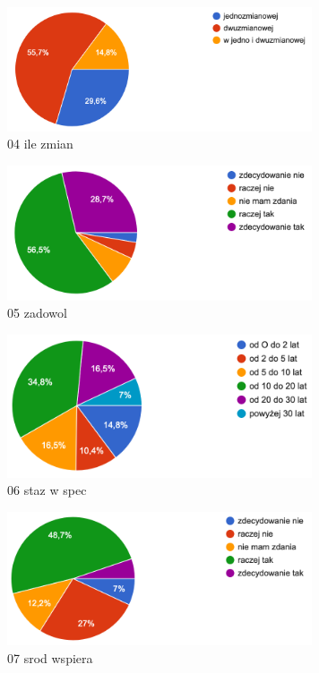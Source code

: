 \begin{figure}
    \includegraphics[width=9cm]{wyniki/04_ile_zmian}
    \caption{ 04 ile zmian }
\end{figure}

\begin{figure}
    \includegraphics[width=9cm]{wyniki/05_zadowol}
    \caption{ 05 zadowol }
\end{figure}

\begin{figure}
    \includegraphics[width=9cm]{wyniki/06_staz_w_spec}
    \caption{ 06 staz w spec }
\end{figure}

\begin{figure}
    \includegraphics[width=9cm]{wyniki/07_srod_wspiera}
    \caption{ 07 srod wspiera }
\end{figure}

